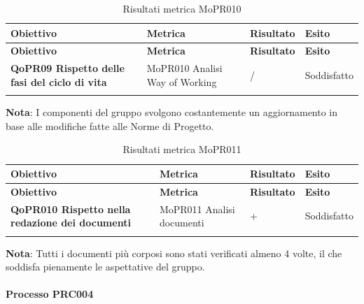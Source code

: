 \documentclass[../piano-di-qualifica.tex]{subfiles}
\begin{document}
\renewcommand{\arraystretch}{2} %
\begin{longtable}[H]{>{\centering\bfseries}m{5cm} >{\centering}m{5cm} >{\centering}m{2.5cm} >{\centering\arraybackslash}m{2.5cm}}  
  \rowcolor{lightgray}
  {\textbf{Obiettivo}} & {\textbf{Metrica}} & {\textbf{Risultato}} & {\textbf{Esito}}  \\
  \endfirsthead%
  \rowcolor{lightgray}
  {\textbf{Obiettivo}} & {\textbf{Metrica}} & {\textbf{Risultato}} & {\textbf{Esito}}  \\
  \endhead%
  \textbf{QoPR09 Rispetto delle fasi del ciclo di vita} & MoPR010 Analisi Way of Working & / & Soddisfatto \\
  \caption{Risultati metrica MoPR010}
  \label{tab:my-table}
\end{longtable}
\textbf{Nota}: I componenti del gruppo svolgono costantemente un aggiornamento in base alle modifiche fatte alle Norme di Progetto.

\renewcommand{\arraystretch}{2} %
\begin{longtable}[H]{>{\centering\bfseries}m{5cm} >{\centering}m{5cm} >{\centering}m{2.5cm} >{\centering\arraybackslash}m{2.5cm}}  
  \rowcolor{lightgray}
  {\textbf{Obiettivo}} & {\textbf{Metrica}} & {\textbf{Risultato}} & {\textbf{Esito}}  \\
  \endfirsthead%
  \rowcolor{lightgray}
  {\textbf{Obiettivo}} & {\textbf{Metrica}} & {\textbf{Risultato}} & {\textbf{Esito}}  \\
  \endhead%
  \textbf{QoPR010 Rispetto nella redazione dei documenti} & MoPR011 Analisi documenti & 4+ & Soddisfatto \\
  \caption{Risultati metrica MoPR011}
  \label{tab:my-table}
\end{longtable}
\textbf{Nota}: Tutti i documenti più corposi sono stati verificati almeno 4 volte, il che soddisfa pienamente le aspettative del gruppo.

\paragraph{Processo PRC004}
\label{sub:processo_PRC004}
\end{document}
